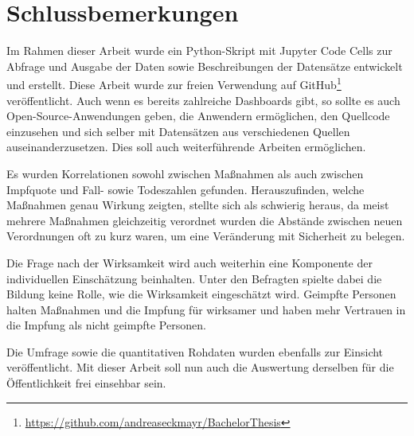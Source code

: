 \chapter{Schlussbemerkungen}
\label{cha:Schluss}

Im Rahmen dieser Arbeit wurde ein Python-Skript mit Jupyter Code Cells zur Abfrage und Ausgabe der Daten sowie Beschreibungen der Datensätze entwickelt und erstellt. Diese Arbeit wurde zur freien Verwendung auf GitHub\footnote{\hyperlink{https://github.com/andreaseckmayr/BachelorThesis/blob/main/survey/Fragebogen\%20-\%20Wirksamkeit\%20d.\%20Covid-19\%20Impfung\%20(Responses)\%20-\%20Form\%20responses\%201.csv}{https://github.com/andreaseckmayr/BachelorThesis}} veröffentlicht. Auch wenn es bereits zahlreiche Dashboards gibt, so sollte es auch Open-Source-Anwendungen geben, die Anwendern ermöglichen, den Quellcode einzusehen und sich selber mit Datensätzen aus verschiedenen Quellen auseinanderzusetzen.
Dies soll auch weiterführende Arbeiten ermöglichen.

Es wurden Korrelationen sowohl zwischen Maßnahmen als auch zwischen Impfquote und Fall- sowie Todeszahlen gefunden. Herauszufinden, welche Maßnahmen genau Wirkung zeigten, stellte sich als schwierig heraus, da meist mehrere Maßnahmen gleichzeitig verordnet wurden die Abstände zwischen neuen Verordnungen oft zu kurz waren, um eine Veränderung mit Sicherheit zu belegen.

Die Frage nach der Wirksamkeit wird auch weiterhin eine Komponente der individuellen Einschätzung beinhalten. Unter den Befragten spielte dabei die Bildung keine Rolle, wie die Wirksamkeit eingeschätzt wird. Geimpfte Personen halten Maßnahmen und die Impfung für wirksamer und haben mehr Vertrauen in die Impfung als nicht geimpfte Personen.

Die Umfrage sowie die quantitativen Rohdaten wurden ebenfalls zur Einsicht veröffentlicht. Mit dieser Arbeit soll nun auch die Auswertung derselben für die Öffentlichkeit frei einsehbar sein.
